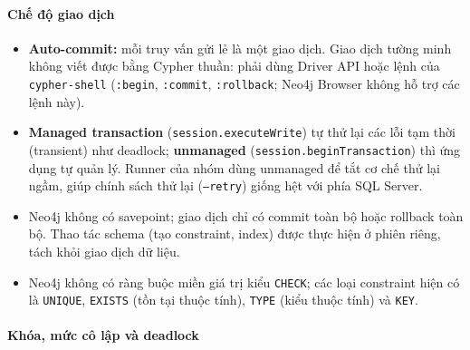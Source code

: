 \paragraph{Chế độ giao dịch}\mbox{}

\begin{itemize}
    \item \textbf{Auto-commit:} mỗi truy vấn gửi lẻ là một giao dịch. Giao dịch tường minh không viết được bằng Cypher thuần: phải dùng Driver API hoặc lệnh của \texttt{cypher-shell} (\texttt{:begin}, \texttt{:commit}, \texttt{:rollback}; Neo4j Browser không hỗ trợ các lệnh này).
    \item \textbf{Managed transaction} (\texttt{session.executeWrite}) tự thử lại các lỗi tạm thời (transient) như deadlock; \textbf{unmanaged} (\texttt{session.beginTransaction}) thì ứng dụng tự quản lý. Runner của nhóm dùng unmanaged để tắt cơ chế thử lại ngầm, giúp chính sách thử lại (\texttt{--retry}) giống hệt với phía SQL Server.
    \item Neo4j không có savepoint; giao dịch chỉ có commit toàn bộ hoặc rollback toàn bộ. Thao tác schema (tạo constraint, index) được thực hiện ở phiên riêng, tách khỏi giao dịch dữ liệu.
    \item Neo4j không có ràng buộc miền giá trị kiểu \texttt{CHECK}; các loại constraint hiện có là \texttt{UNIQUE}, \texttt{EXISTS} (tồn tại thuộc tính), \texttt{TYPE} (kiểu thuộc tính) và \texttt{KEY}.
\end{itemize}

\paragraph{Khóa, mức cô lập và deadlock}\mbox{}

